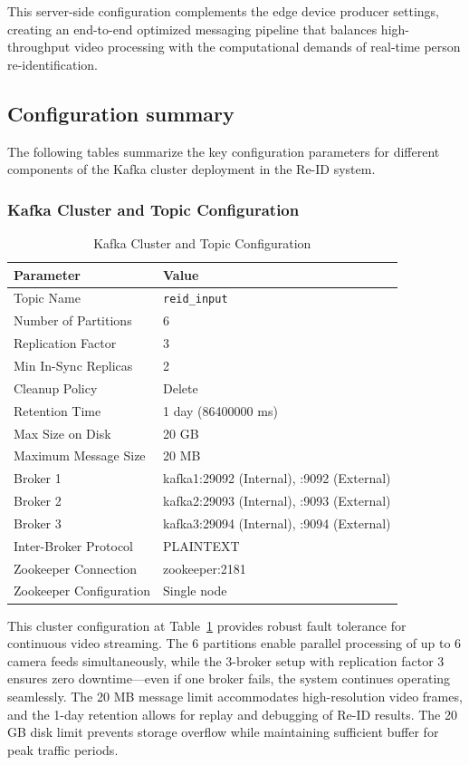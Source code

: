 This server-side configuration complements the edge device producer settings, creating an end-to-end optimized messaging pipeline that balances high-throughput video processing with the computational demands of real-time person re-identification.

\subsection{Configuration summary}

The following tables summarize the key configuration parameters for different components of the Kafka cluster deployment in the Re-ID system.

\subsubsection{Kafka Cluster and Topic Configuration}

\begin{table}[htbp]
\centering
\caption{Kafka Cluster and Topic Configuration}
\label{tab:kafka_cluster_config}
\begin{tabular}{|p{4cm}|p{8cm}|}
\hline
\textbf{Parameter} & \textbf{Value} \\
\hline
Topic Name & \texttt{reid\_input} \\
Number of Partitions & 6 \\
Replication Factor & 3 \\
Min In-Sync Replicas & 2 \\
Cleanup Policy & Delete \\
Retention Time & 1 day (86400000 ms) \\
Max Size on Disk & 20 GB \\
Maximum Message Size & 20 MB \\
\hline
Broker 1 & kafka1:29092 (Internal), :9092 (External) \\
Broker 2 & kafka2:29093 (Internal), :9093 (External) \\
Broker 3 & kafka3:29094 (Internal), :9094 (External) \\
Inter-Broker Protocol & PLAINTEXT \\
\hline
Zookeeper Connection & zookeeper:2181 \\
Zookeeper Configuration & Single node \\
\hline
\end{tabular}
\end{table}

This cluster configuration at Table~\ref{tab:kafka_cluster_config} provides robust fault tolerance for continuous video streaming. The 6 partitions enable parallel processing of up to 6 camera feeds simultaneously, while the 3-broker setup with replication factor 3 ensures zero downtime—even if one broker fails, the system continues operating seamlessly. The 20 MB message limit accommodates high-resolution video frames, and the 1-day retention allows for replay and debugging of Re-ID results. The 20 GB disk limit prevents storage overflow while maintaining sufficient buffer for peak traffic periods.

